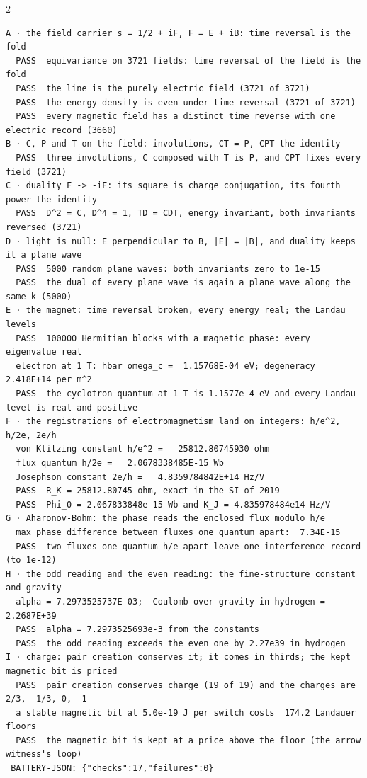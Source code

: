 \documentclass[10pt]{article}
\begin{document}
\begin{multicols}{2}
\begin{Verbatim}[fontsize=\fontsize{6.0}{6.9}\selectfont,breaklines,breakanywhere,breaksymbolleft={}]
A · the field carrier s = 1/2 + iF, F = E + iB: time reversal is the fold
  PASS  equivariance on 3721 fields: time reversal of the field is the fold
  PASS  the line is the purely electric field (3721 of 3721)
  PASS  the energy density is even under time reversal (3721 of 3721)
  PASS  every magnetic field has a distinct time reverse with one electric record (3660)
B · C, P and T on the field: involutions, CT = P, CPT the identity
  PASS  three involutions, C composed with T is P, and CPT fixes every field (3721)
C · duality F -> -iF: its square is charge conjugation, its fourth power the identity
  PASS  D^2 = C, D^4 = 1, TD = CDT, energy invariant, both invariants reversed (3721)
D · light is null: E perpendicular to B, |E| = |B|, and duality keeps it a plane wave
  PASS  5000 random plane waves: both invariants zero to 1e-15
  PASS  the dual of every plane wave is again a plane wave along the same k (5000)
E · the magnet: time reversal broken, every energy real; the Landau levels
  PASS  100000 Hermitian blocks with a magnetic phase: every eigenvalue real
  electron at 1 T: hbar omega_c =  1.15768E-04 eV; degeneracy  2.418E+14 per m^2
  PASS  the cyclotron quantum at 1 T is 1.1577e-4 eV and every Landau level is real and positive
F · the registrations of electromagnetism land on integers: h/e^2, h/2e, 2e/h
  von Klitzing constant h/e^2 =   25812.80745930 ohm
  flux quantum h/2e =   2.0678338485E-15 Wb
  Josephson constant 2e/h =   4.8359784842E+14 Hz/V
  PASS  R_K = 25812.80745 ohm, exact in the SI of 2019
  PASS  Phi_0 = 2.067833848e-15 Wb and K_J = 4.835978484e14 Hz/V
G · Aharonov-Bohm: the phase reads the enclosed flux modulo h/e
  max phase difference between fluxes one quantum apart:  7.34E-15
  PASS  two fluxes one quantum h/e apart leave one interference record (to 1e-12)
H · the odd reading and the even reading: the fine-structure constant and gravity
  alpha = 7.2973525737E-03;  Coulomb over gravity in hydrogen =  2.2687E+39
  PASS  alpha = 7.2973525693e-3 from the constants
  PASS  the odd reading exceeds the even one by 2.27e39 in hydrogen
I · charge: pair creation conserves it; it comes in thirds; the kept magnetic bit is priced
  PASS  pair creation conserves charge (19 of 19) and the charges are 2/3, -1/3, 0, -1
  a stable magnetic bit at 5.0e-19 J per switch costs  174.2 Landauer floors
  PASS  the magnetic bit is kept at a price above the floor (the arrow witness's loop)
 BATTERY-JSON: {"checks":17,"failures":0}
\end{Verbatim}
\end{multicols}
\end{document}

